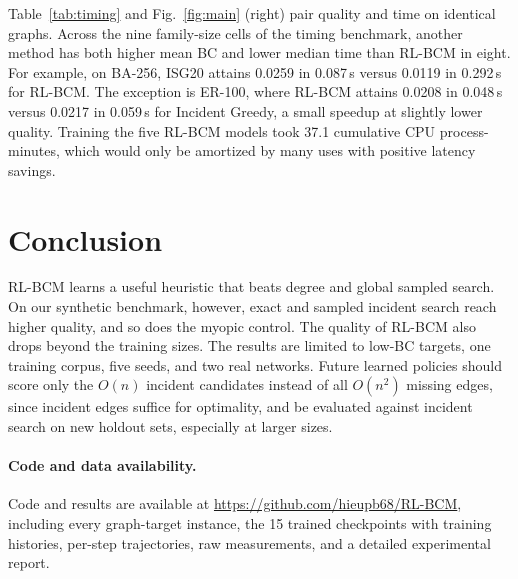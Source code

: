 \documentclass[runningheads]{llncs}
\newcommand{\rlbcm}{RL-BCM}
\newcommand{\codeurl}{\url{https://github.com/hieupb68/RL-BCM}}
\begin{document}
Table~\ref{tab:timing} and Fig.~\ref{fig:main} (right) pair quality and
time on identical graphs. Across the nine family-size cells of the timing
benchmark, another method has both higher mean BC and lower median time
than \rlbcm{} in eight. For example, on BA-256, ISG20 attains 0.0259 in
0.087\,s versus 0.0119 in 0.292\,s for \rlbcm. The exception is ER-100,
where \rlbcm{} attains 0.0208 in 0.048\,s versus 0.0217 in 0.059\,s for
Incident Greedy, a small speedup at slightly lower quality. Training the
five \rlbcm{} models took 37.1 cumulative CPU process-minutes, which would
only be amortized by many uses with positive latency savings.

\section{Conclusion}
\label{sec:conclusion}
\rlbcm{} learns a useful heuristic that beats degree and global sampled
search. On our synthetic benchmark, however, exact and sampled incident
search reach higher quality, and so does the myopic control. The quality
of \rlbcm{} also drops beyond the training sizes. The results are limited to low-BC
targets, one training corpus, five seeds, and two real networks. Future
learned policies should score only the $O(n)$ incident candidates instead
of all $O(n^2)$ missing edges, since incident edges suffice for optimality,
and be evaluated against incident search on new holdout sets, especially
at larger sizes.

\paragraph{Code and data availability.}
Code and results are available at \codeurl, including
every graph-target instance, the 15 trained checkpoints with training
histories, per-step trajectories, raw measurements, and a detailed
experimental report.



\end{document}
